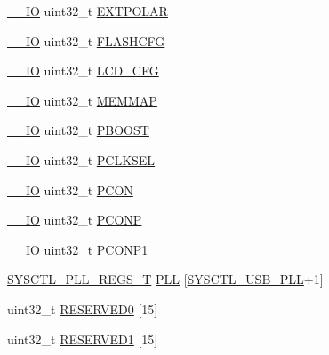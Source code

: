 \begin{DoxyCompactItemize}
\hyperlink{core__cm3_8h_aec43007d9998a0a0e01faede4133d6be}{\+\_\+\+\_\+\+IO} uint32\+\_\+t \hyperlink{structLPC__SYSCTL__T_a7d0423c5e3f7482182c229bbc4b2b83b}{E\+X\+T\+P\+O\+L\+AR}
\item 
\hyperlink{core__cm3_8h_aec43007d9998a0a0e01faede4133d6be}{\+\_\+\+\_\+\+IO} uint32\+\_\+t \hyperlink{structLPC__SYSCTL__T_a8dcbc2e1c89d7bd42dbd19f66e2ddd8e}{F\+L\+A\+S\+H\+C\+FG}
\item 
\hyperlink{core__cm3_8h_aec43007d9998a0a0e01faede4133d6be}{\+\_\+\+\_\+\+IO} uint32\+\_\+t \hyperlink{structLPC__SYSCTL__T_aef5d629c590fd35e8da2e061ddcdf17e}{L\+C\+D\+\_\+\+C\+FG}
\item 
\hyperlink{core__cm3_8h_aec43007d9998a0a0e01faede4133d6be}{\+\_\+\+\_\+\+IO} uint32\+\_\+t \hyperlink{structLPC__SYSCTL__T_a5a5d2dc160a256a110878af0c2757a64}{M\+E\+M\+M\+AP}
\item 
\hyperlink{core__cm3_8h_aec43007d9998a0a0e01faede4133d6be}{\+\_\+\+\_\+\+IO} uint32\+\_\+t \hyperlink{structLPC__SYSCTL__T_acc912b84bbe8dc170fdf50300d341acb}{P\+B\+O\+O\+ST}
\item 
\hyperlink{core__cm3_8h_aec43007d9998a0a0e01faede4133d6be}{\+\_\+\+\_\+\+IO} uint32\+\_\+t \hyperlink{structLPC__SYSCTL__T_a55111e26d098f9e4ee0dbfd5b243a014}{P\+C\+L\+K\+S\+EL}
\item 
\hyperlink{core__cm3_8h_aec43007d9998a0a0e01faede4133d6be}{\+\_\+\+\_\+\+IO} uint32\+\_\+t \hyperlink{structLPC__SYSCTL__T_a92e2ea242fb2d75af44c1979a8cf9ce4}{P\+C\+ON}
\item 
\hyperlink{core__cm3_8h_aec43007d9998a0a0e01faede4133d6be}{\+\_\+\+\_\+\+IO} uint32\+\_\+t \hyperlink{structLPC__SYSCTL__T_a27650e24e19bd3b8db140db39d9ab1c4}{P\+C\+O\+NP}
\item 
\hyperlink{core__cm3_8h_aec43007d9998a0a0e01faede4133d6be}{\+\_\+\+\_\+\+IO} uint32\+\_\+t \hyperlink{structLPC__SYSCTL__T_a7e1241849ab9c934991342896ba7c296}{P\+C\+O\+N\+P1}
\item 
\hyperlink{structSYSCTL__PLL__REGS__T}{S\+Y\+S\+C\+T\+L\+\_\+\+P\+L\+L\+\_\+\+R\+E\+G\+S\+\_\+T} \hyperlink{structLPC__SYSCTL__T_aabc2ad04761cf7c1cbfa8a43ddc91c84}{P\+LL} \mbox{[}\hyperlink{group__SYSCTL__17XX__40XX_gga5f5478a201b021ed04a0724bff524c4ba5ee38509163556b883664d7259c43dfd}{S\+Y\+S\+C\+T\+L\+\_\+\+U\+S\+B\+\_\+\+P\+LL}+1\mbox{]}
\item 
uint32\+\_\+t \hyperlink{structLPC__SYSCTL__T_aba8b07e1d5fe15516928f19d739f700e}{R\+E\+S\+E\+R\+V\+E\+D0} \mbox{[}15\mbox{]}
\item 
uint32\+\_\+t \hyperlink{structLPC__SYSCTL__T_a794708954b13d73772d88570372b7e31}{R\+E\+S\+E\+R\+V\+E\+D1} \mbox{[}15\mbox{]}

\end{DoxyCompactItemize}
